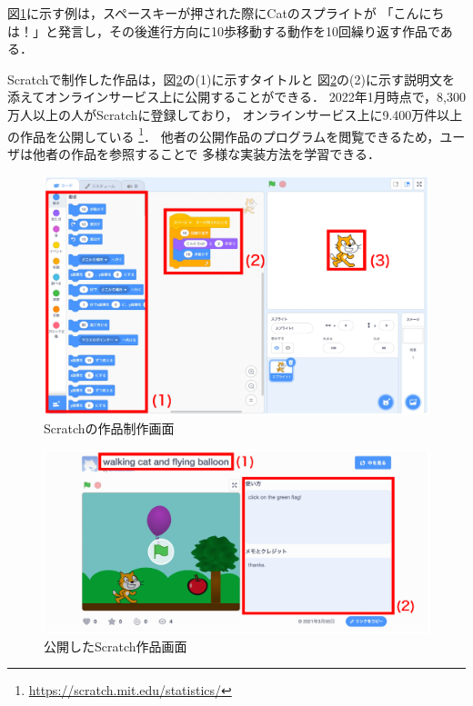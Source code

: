 \documentclass[11pt]{jreport}
\begin{document}
図\ref{scratchdisplay}に示す例は，スペースキーが押された際にCatのスプライトが
「こんにちは！」と発言し，その後進行方向に10歩移動する動作を10回繰り返す作品である．

Scratchで制作した作品は，図\ref{scratchonline}の(1)に示すタイトルと
図\ref{scratchonline}の(2)に示す説明文を添えてオンラインサービス上に公開することができる．
2022年1月時点で，8,300万人以上の人がScratchに登録しており，
オンラインサービス上に9.400万件以上の作品を公開している
\footnote{\url{https://scratch.mit.edu/statistics/}}．
他者の公開作品のプログラムを閲覧できるため，ユーザは他者の作品を参照することで
多様な実装方法を学習できる\cite{spfa}．

\begin{figure}[H]
    \centering
    \includegraphics[width=12cm]{scratch_display.eps}
    \caption{Scratchの作品制作画面}
    \label{scratchdisplay}
\end{figure}

\begin{figure}[H]
    \centering
    \includegraphics[width=15cm]{scratch_online.eps}
    \caption{公開したScratch作品画面}
    \label{scratchonline}
\end{figure}
\end{document}
